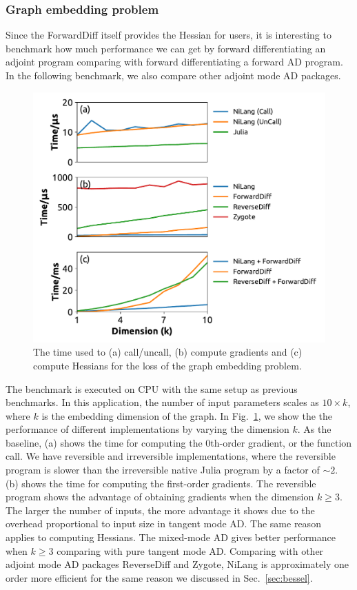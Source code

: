\documentclass{article}
\newcommand{\<}{\langle}
\renewcommand{\>}{\rangle}
\newcommand{\Fig}[1]{Fig.~\ref{#1}}
\newcommand{\Sec}[1]{Sec.~\ref{#1}}
\theoremstyle{definition}\newtheorem{definition}{\textit{Definition}}
\begin{document}
\subsubsection{Graph embedding problem}
Since the ForwardDiff itself provides the Hessian for users, it is interesting to benchmark how much performance we can get by forward differentiating an adjoint program comparing with forward differentiating a forward AD program. In the following benchmark, we also compare other adjoint mode AD packages.
\begin{figure}
    \centerline{\includegraphics[width=0.8\columnwidth,trim={0 0 0 0},clip]{fig7.pdf}}
    \caption{The time used to (a) call/uncall, (b) compute gradients and (c) compute Hessians for the loss of the graph embedding problem.}\label{fig:bench-embedding}
\end{figure}
The benchmark is executed on CPU with the same setup as previous benchmarks.
In this application, the number of input parameters scales as $10 \times k$, where $k$ is the embedding dimension of the graph.
In \Fig{fig:bench-embedding}, we show the the performance of different implementations by varying the dimension $k$.
As the baseline, (a) shows the time for computing the 0th-order gradient, or the function call. We have reversible and irreversible implementations, where the reversible program is slower than the irreversible native Julia program by a factor of $\sim2$.
(b) shows the time for computing the first-order gradients. The reversible program shows the advantage of obtaining gradients when the dimension $k \geq 3$. The larger the number of inputs, the more advantage it shows due to the overhead proportional to input size in tangent mode AD.
The same reason applies to computing Hessians. The mixed-mode AD gives better performance when $k \geq 3$ comparing with pure tangent mode AD.
Comparing with other adjoint mode AD packages ReverseDiff and Zygote, NiLang is approximately one order more efficient for the same reason we discussed in \Sec{sec:bessel}.
\end{document}
